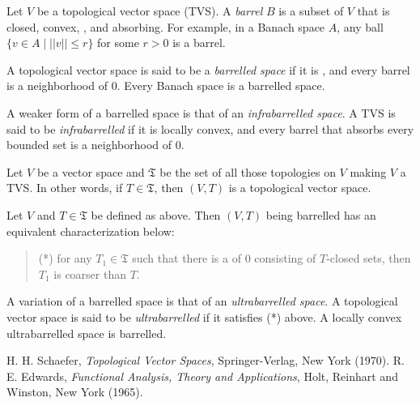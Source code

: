 \documentclass[12pt]{article}
\begin{document}
Let $V$ be a topological vector space (TVS).  A \emph{barrel} $B$ is a subset of $V$ that is closed, convex, , and absorbing.  For example, in a Banach space $A$, any ball $\lbrace v\in A\mid ||v||\le r\rbrace$ for some $r>0$ is a barrel.

A topological vector space is said to be a \emph{barrelled space} if it is , and every barrel is a neighborhood of $0$.  Every Banach space is a barrelled space.

A weaker form of a barrelled space is that of an \emph{infrabarrelled space}.  A TVS is said to be \emph{infrabarrelled} if it is locally convex, and every barrel that absorbs every bounded set is a neighborhood of $0$.

Let $V$ be a vector space and $\mathfrak{T}$ be the set of all those topologies on $V$ making $V$ a TVS.  In other words, if $T\in \mathfrak{T}$, then $(V,T)$ is a topological vector space.

Let $V$ and $T\in \mathfrak{T}$ be defined as above.  Then $(V,T)$ being barrelled has an equivalent characterization below:
\begin{quote}
(*) for any $T_1\in \mathfrak{T}$ such that there is a  of $0$ consisting of $T$-closed sets, then $T_1$ is coarser than $T$.
\end{quote}

A variation of a barrelled space is that of an \emph{ultrabarrelled space}.  A topological vector space is said to be \emph{ultrabarrelled} if it satisfies (*) above.  A locally convex ultrabarrelled space is barrelled.


\begin{thebibliography}{8}
 H. H. Schaefer, {\em Topological Vector Spaces}, Springer-Verlag, New York (1970).
 R. E. Edwards, {\em Functional Analysis, Theory and Applications}, Holt, Reinhart and Winston, New York (1965).
\end{thebibliography}
\end{document}
